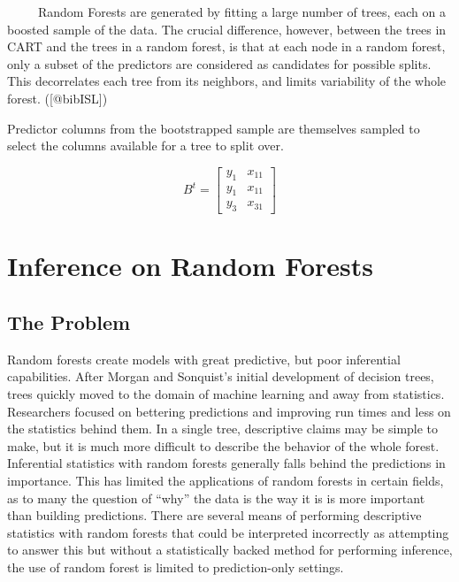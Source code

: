 \documentclass[12pt,twoside]{reedthesis}
\begin{document}
  ~~~~~Random Forests are generated by fitting a large number of trees,
  each on a boosted sample of the data. The crucial difference, however,
  between the trees in CART and the trees in a random forest, is that at
  each node in a random forest, only a subset of the predictors are
  considered as candidates for possible splits. This decorrelates each
  tree from its neighbors, and limits variability of the whole forest.
  ({[}@bibISL{]})
  
  Predictor columns from the bootstrapped sample are themselves sampled to
  select the columns available for a tree to split over.
  
  \[{B}^t = \begin{bmatrix} 
  y_{1} &  x_{11} \\
  y_1  &  x_{11} \\
  y_3  &  x_{31} 
  \end{bmatrix}\]
  
  \section{Inference on Random Forests}\label{inference-on-random-forests}
  
  \subsection{The Problem}\label{the-problem}
  
  Random forests create models with great predictive, but poor inferential
  capabilities. After Morgan and Sonquist's initial development of
  decision trees, trees quickly moved to the domain of machine learning
  and away from statistics. Researchers focused on bettering predictions
  and improving run times and less on the statistics behind them. In a
  single tree, descriptive claims may be simple to make, but it is much
  more difficult to describe the behavior of the whole forest. Inferential
  statistics with random forests generally falls behind the predictions in
  importance. This has limited the applications of random forests in
  certain fields, as to many the question of ``why'' the data is the way
  it is is more important than building predictions. There are several
  means of performing descriptive statistics with random forests that
  could be interpreted incorrectly as attempting to answer this but
  without a statistically backed method for performing inference, the use
  of random forest is limited to prediction-only settings.
  
\end{document}
